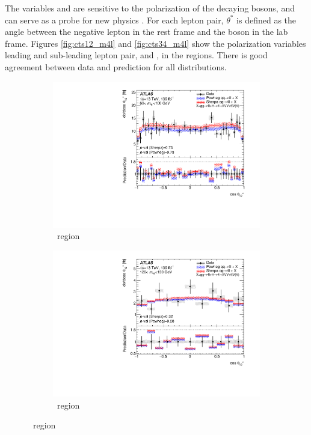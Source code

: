 The variables \CTSOneTwo{} and \CTSThreeFour{} are sensitive to the polarization of the decaying bosons, and can serve as a probe for new physics \cite{Denner_2020}. For each lepton pair, $\theta^*$ is defined as the angle between the negative lepton in the \Z rest frame and the \Z boson in the lab frame. Figures \ref{fig:cts12_m4l} and \ref{fig:cts34_m4l} show the polarization variables leading and sub-leading lepton pair, \CTSOneTwo{} and \CTSThreeFour{}, in the \mFourL{} regions. There is good agreement between data and prediction for all distributions. 
\begin{figure}[htb!]
    \begin{subfigure}{.49\textwidth}\centering
      \includegraphics[width=.99\linewidth]{Figures/m4l/UnfoldedResults/linY_Unfolded_Data_cosThetaStar1_m4l60-100.pdf}\caption{\ZFourL \ region}\label{fig:sub-first}
    \end{subfigure}
    \begin{subfigure}{.49\textwidth}\centering
      \includegraphics[width=.99\linewidth]{Figures/m4l/UnfoldedResults/linY_Unfolded_Data_cosThetaStar1_m4l120-130.pdf} \caption{\HFourL \ region}\label{fig:sub-second}

\end{subfigure}
\end{figure}
